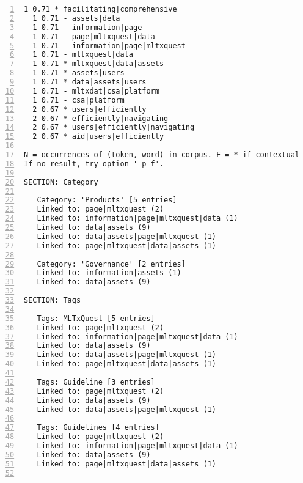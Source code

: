 \documentclass[10pt]{article}
\begin{document}
{\begin{lstlisting}[numbers=left,basicstyle=\ttfamily\footnotesize, frame=none]
  1 0.71 * facilitating|comprehensive                                    page|mltxquest
  1 0.71 - assets|deta                                                   page|mltxquest
  1 0.71 - information|page                                              page|mltxquest
  1 0.71 - page|mltxquest|data                                           page|mltxquest
  1 0.71 - information|page|mltxquest                                    page|mltxquest
  1 0.71 - mltxquest|data                                                page|mltxquest
  1 0.71 * mltxquest|data|assets                                         page|mltxquest
  1 0.71 * assets|users                                                  page|mltxquest
  1 0.71 * data|assets|users                                             page|mltxquest
  1 0.71 - mltxdat|csa|platform                                          information|assets
  1 0.71 - csa|platform                                                  information|assets
  2 0.67 * users|efficiently                                             data|assets
  2 0.67 * efficiently|navigating                                        data|assets
  2 0.67 * users|efficiently|navigating                                  data|assets
  2 0.67 * aid|users|efficiently                                         data|assets

N = occurrences of (token, word) in corpus. F = * if contextual pair.
If no result, try option '-p f'.

SECTION: Category

   Category: 'Products' [5 entries]
   Linked to: page|mltxquest (2)
   Linked to: information|page|mltxquest|data (1)
   Linked to: data|assets (9)
   Linked to: data|assets|page|mltxquest (1)
   Linked to: page|mltxquest|data|assets (1)

   Category: 'Governance' [2 entries]
   Linked to: information|assets (1)
   Linked to: data|assets (9)

SECTION: Tags

   Tags: MLTxQuest [5 entries]
   Linked to: page|mltxquest (2)
   Linked to: information|page|mltxquest|data (1)
   Linked to: data|assets (9)
   Linked to: data|assets|page|mltxquest (1)
   Linked to: page|mltxquest|data|assets (1)

   Tags: Guideline [3 entries]
   Linked to: page|mltxquest (2)
   Linked to: data|assets (9)
   Linked to: data|assets|page|mltxquest (1)

   Tags: Guidelines [4 entries]
   Linked to: page|mltxquest (2)
   Linked to: information|page|mltxquest|data (1)
   Linked to: data|assets (9)
   Linked to: page|mltxquest|data|assets (1)


\end{lstlisting}}
\end{document}
